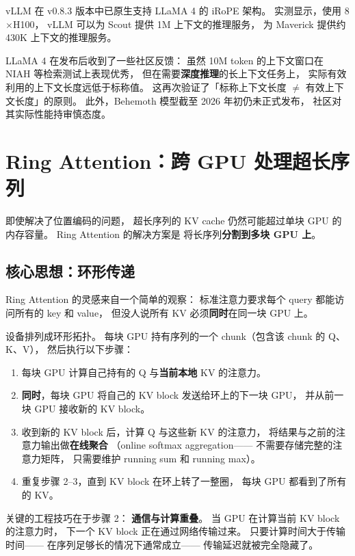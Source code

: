 vLLM 在 v0.8.3 版本中已原生支持 LLaMA 4 的 iRoPE 架构。
实测显示，使用 8$\times$H100，
vLLM 可以为 Scout 提供 1M 上下文的推理服务，
为 Maverick 提供约 430K 上下文的推理服务。

\begin{warnbox}
LLaMA 4 在发布后收到了一些社区反馈：
虽然 10M token 的上下文窗口在 NIAH 等检索测试上表现优秀，
但在需要\textbf{深度推理}的长上下文任务上，
实际有效利用的上下文长度远低于标称值。
这再次验证了「标称上下文长度 $\neq$ 有效上下文长度」的原则。
此外，Behemoth 模型截至 2026 年初仍未正式发布，
社区对其实际性能持审慎态度。
\end{warnbox}

\section{Ring Attention：跨 GPU 处理超长序列}

即使解决了位置编码的问题，
超长序列的 KV cache 仍然可能超过单块 GPU 的内存容量。
Ring Attention 的解决方案是
将长序列\textbf{分割到多块 GPU 上}。

\subsection{核心思想：环形传递}

Ring Attention 的灵感来自一个简单的观察：
标准注意力要求每个 query 都能访问所有的 key 和 value，
但没人说所有 KV 必须\textbf{同时}在同一块 GPU 上。

设备排列成环形拓扑。
每块 GPU 持有序列的一个 chunk（包含该 chunk 的 Q、K、V），
然后执行以下步骤：
\begin{enumerate}[noitemsep]
  \item 每块 GPU 计算自己持有的 Q 与\textbf{当前本地} KV 的注意力。
  \item \textbf{同时}，每块 GPU 将自己的 KV block
        发送给环上的下一块 GPU，
        并从前一块 GPU 接收新的 KV block。
  \item 收到新的 KV block 后，计算 Q 与这些新 KV 的注意力，
        将结果与之前的注意力输出做\textbf{在线聚合}
        （online softmax aggregation——
        不需要存储完整的注意力矩阵，
        只需要维护 running sum 和 running max）。
  \item 重复步骤 2--3，直到 KV block 在环上转了一整圈，
        每块 GPU 都看到了所有的 KV。
\end{enumerate}

关键的工程技巧在于步骤 2：
\textbf{通信与计算重叠}。
当 GPU 在计算当前 KV block 的注意力时，
下一个 KV block 正在通过网络传输过来。
只要计算时间大于传输时间——
在序列足够长的情况下通常成立——
传输延迟就被完全隐藏了。

